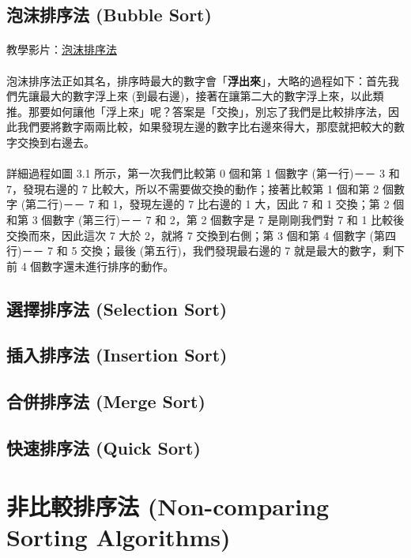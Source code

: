 \documentclass[12pt,a4paper,oneside]{report}
\begin{document}
\begin{CJK}{UTF8}{bkai}
\subsection{泡沫排序法 (Bubble Sort)}

\paragraph{}教學影片：\href{https://www.youtube.com/watch?v=lyZQPjUT5B4}{泡沫排序法}

\paragraph{}泡沫排序法正如其名，排序時最大的數字會「\textbf{浮出來}」，大略的過程如下：首先我們先讓最大的數字浮上來 (到最右邊)，接著在讓第二大的數字浮上來，以此類推。那要如何讓他「浮上來」呢？答案是「交換」，別忘了我們是比較排序法，因此我們要將數字兩兩比較，如果發現左邊的數字比右邊來得大，那麼就把較大的數字交換到右邊去。

\paragraph{}詳細過程如圖 3.1 所示，第一次我們比較第 0 個和第 1 個數字 (第一行)－－ 3 和 7，發現右邊的 7 比較大，所以不需要做交換的動作；接著比較第 1 個和第 2 個數字 (第二行)－－ 7 和 1，發現左邊的 7 比右邊的 1 大，因此 7 和 1 交換；第 2 個和第 3 個數字 (第三行)－－ 7 和 2，第 2 個數字是 7 是剛剛我們對 7 和 1 比較後交換而來，因此這次 7 大於 2，就將 7 交換到右側；第 3 個和第 4 個數字 (第四行)－－ 7 和 5 交換；最後 (第五行)，我們發現最右邊的 7 就是最大的數字，剩下前 4 個數字還未進行排序的動作。

\subsection{選擇排序法 (Selection Sort)}
\subsection{插入排序法 (Insertion Sort)}
\subsection{合併排序法 (Merge Sort)}
\subsection{快速排序法 (Quick Sort)}
\section{非比較排序法 (Non-comparing Sorting Algorithms)}

\end{CJK}
\end{document}
